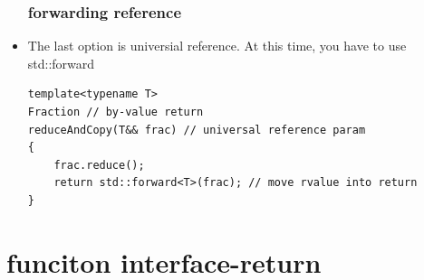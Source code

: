 \documentclass[a4paper,11pt,twoside]{book}
\begin{document}
\begin{itemize}
\subsubsection{forwarding reference}

\item The last option is universial reference. At this time, you have to use std::forward 
\begin{lstlisting}[numbers=none]
template<typename T>
Fraction // by-value return
reduceAndCopy(T&& frac) // universal reference param
{
	frac.reduce();
	return std::forward<T>(frac); // move rvalue into return
} 
\end{lstlisting}

\end{itemize}

\section{funciton interface-return}
\end{document}
